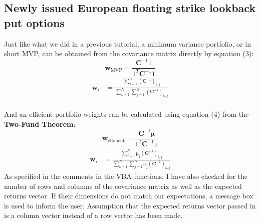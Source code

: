 \subsection{Newly issued European floating strike lookback put options}
Just like what we did in a previous tutorial, a minimum variance portfolio, or in short MVP, can be obtained from the covariance matrix directly by equation (3):
$$ \textbf{w}_{\text{MVP}} = \frac{\textbf{C}^{-1}\mathrm{1}}{\mathrm{1}^{T}\textbf{C}^{-1}\mathrm{1}} $$
\begin{equation}
\begin{split}
\textbf{w}_{i} &= \frac{\sum_{j=1}^{N} (\textbf{C}^{-1})_{i,j}}{\sum_{k=1}^{N}\sum_{j=1}^{N} (\textbf{C}^{-1})_{k,j}}
\end{split}
\end{equation}
\\[6mm]And an efficient portfolio weights can be calculated using equation (4) from the \textbf{Two-Fund Theorem}:
$$ \textbf{w}_{\text{efficient}} = \frac{\textbf{C}^{-1}\mathrm{\mu}}{\mathrm{1}^{T}\textbf{C}^{-1}\mathrm{\mu}} $$
\begin{equation}
\begin{split}
\textbf{w}_{i} &= \frac{\sum_{j=1}^{N} \mathrm{\mu}_{j}(\textbf{C}^{-1})_{i,j}}{\sum_{k=1}^{N}\sum_{j=1}^{N} \mathrm{\mu}_{j}(\textbf{C}^{-1})_{k,j}}
\end{split}
\end{equation}
As specified in the comments in the VBA functions, I have also checked for the number of rows and columns of the covariance matrix as well as the expected returns vector. If their dimensions do not match our expectations, a message box is used to inform the user. Assumption that the expected returns vector passed in is a column vector instead of a row vector has been made.
\newpage

